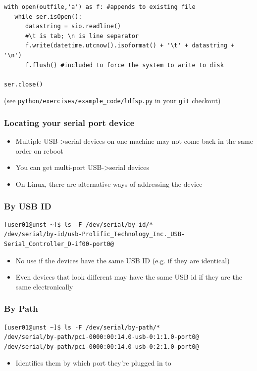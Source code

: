 \documentclass[aspectratio=1610,9pt]{beamer} %
\begin{document}
\begin{frame}[fragile]
\begin{verbatim}
with open(outfile,'a') as f: #appends to existing file
   while ser.isOpen():
      datastring = sio.readline()
      #\t is tab; \n is line separator
      f.write(datetime.utcnow().isoformat() + '\t' + datastring + '\n')
      f.flush() #included to force the system to write to disk

ser.close()
\end{verbatim}

(see \texttt{python/exercises/example\_code/ldfsp.py} in your
\texttt{git} checkout)

\end{frame}
\begin{frame}[fragile]
\frametitle{Locating your serial port device}

\begin{itemize}
\itemsep1pt\parskip0pt
\item
  Multiple USB-\textgreater{}serial devices on one machine may not come
  back in the same order on reboot
\item
  You can get multi-port USB-\textgreater{}serial devices
\item
  On Linux, there are alternative ways of addressing the device
\end{itemize}

\subsubsection{By USB ID}

\begin{verbatim}
[user01@unst ~]$ ls -F /dev/serial/by-id/*
/dev/serial/by-id/usb-Prolific_Technology_Inc._USB-Serial_Controller_D-if00-port0@
\end{verbatim}

\begin{itemize}
\itemsep1pt\parskip0pt
\item
  No use if the devices have the same USB ID (e.g. if they are
  identical)
\item
  Even devices that look different may have the same USB id if they are
  the same electronically
\end{itemize}

\subsubsection{By Path}

\begin{verbatim}
[user01@unst ~]$ ls -F /dev/serial/by-path/*
/dev/serial/by-path/pci-0000:00:14.0-usb-0:1:1.0-port0@
/dev/serial/by-path/pci-0000:00:14.0-usb-0:2:1.0-port0@
\end{verbatim}

\begin{itemize}
\itemsep1pt\parskip0pt
\item
  Identifies them by which port they're plugged in to
\end{itemize}

\end{frame}
\end{document}
